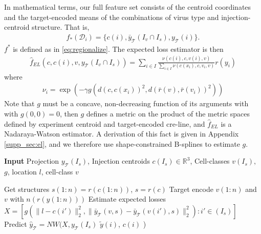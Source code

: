 In mathematical terms, our full feature set consists of the centroid coordinates and the target-encoded means of the combinations of virus type and injection-centroid structure.
That is, 
\begin{eqnarray*}
f_*({\mathcal D}_i) = \{c(i) , \bar y_{\mathcal T} ( {I_v} \cap I_s), y_{\mathcal T}(i) \}.
\end{eqnarray*}
$f^*$ is defined as in \eqref{eq:regionalize}.
The expected loss estimator is then 
\begin{eqnarray*}
\hat f_{EL} (c, c(i),v, y_{\mathcal T} (I_v \cap I_s)) =  \sum_{i \in I} \frac{ \nu {(c(i) , c, v(i), v)}}{\sum_{i \in I} \nu {(c(x_i) , c, v_i, v) }} r(y_i)
\end{eqnarray*}
where
\begin{eqnarray*}
\nu_i = \exp (- \gamma g( d(c, c(x_i))^2, d(\bar r (v), \bar r (v_i))^2))
\end{eqnarray*}
Note that $g$ must be a concave, non-decreasing function of its arguments with with $g(0,0) = 0$, then $g$ defines a metric on the product of the metric spaces defined by experiment centroid and target-encoded cre-line, and $\hat f_{EL}$ is a Nadaraya-Watson estimator. 
A derivation of this fact is given in Appendix \ref{supp_sec:el}, and we therefore use shape-constrained B-splines to estimate $g$.



\begin{algorithm}[H]
\begin{algorithmic}
\caption{{\bf Input} Projection $y_{\mathcal T}(I_s)$, Injection centroids $c(I_s) \in \mathbb R^3$, Cell-classes $v(I_s),$ $g$, location $l$, cell-class $v$}
\State Get structures $s(1:n) = r(c(1:n))$, $s = r(c)$
\State Target encode $v(1:n)$ and $v$ with $n(r(y(1:n)))$
\State 
\State Estimate expected losses $X = [g (\|l - c(i')\|_2^2, \|\bar y_{\mathcal T}(v, s) - \bar y_{\mathcal T}(v(i'), s)\|_2^2) : i' \in ( I_s )]$
\State Predict $\widehat y_{\mathcal T} = NW(X, y_{\mathcal T}(I_s)$
 $\tilde y(i)$, $c(i)$ )  
\end{algorithmic}
\label{alg:preprocess}
\end{algorithm}

